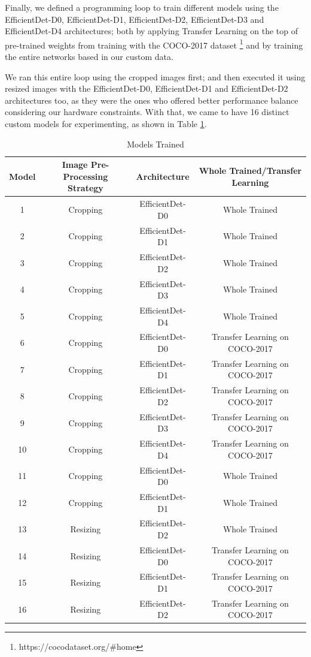 Finally, we defined a programming loop to train different models using the EfficientDet-D0,
EfficientDet-D1, EfficientDet-D2, EfficientDet-D3 and EfficientDet-D4 architectures; both by
applying Transfer Learning on the top of pre-trained weights from training with the COCO-2017 dataset 
\footnote{https://cocodataset.org/\#home} and by training the entire networks based in our custom data. 

We ran this entire loop using the cropped images first; and then executed it using resized images with the EfficientDet-D0,
EfficientDet-D1 and EfficientDet-D2 architectures too, as they were the ones who offered better
performance balance considering our hardware constraints. 
With that, we came to have 16 distinct custom models for experimenting, as shown in Table \ref{tbl:modelsTrainedTab}.

\begin{table}[H]
	\centering
	\caption[Models Trained]{Models Trained}
	\begin{adjustbox}{width=1\textwidth}
	\label{tab:modelsTrained}
	\begin{tabular}{c|c|c|c}
		\hline 
		Model & Image Pre-Processing Strategy & Architecture & Whole Trained/Transfer Learning \\
		\hline
        1 & Cropping & EfficientDet-D0 & Whole Trained \\
		2 & Cropping & EfficientDet-D1 & Whole Trained \\
		3 & Cropping & EfficientDet-D2 & Whole Trained \\
		4 & Cropping & EfficientDet-D3 & Whole Trained \\
		5 & Cropping & EfficientDet-D4 & Whole Trained \\
		6 & Cropping & EfficientDet-D0 & Transfer Learning on COCO-2017 \\
		7 & Cropping & EfficientDet-D1 & Transfer Learning on COCO-2017 \\
		8 & Cropping & EfficientDet-D2 & Transfer Learning on COCO-2017 \\
		9 & Cropping & EfficientDet-D3 & Transfer Learning on COCO-2017 \\
		10 & Cropping & EfficientDet-D4 & Transfer Learning on COCO-2017 \\
		11 & Cropping & EfficientDet-D0 & Whole Trained \\
		12 & Cropping & EfficientDet-D1 & Whole Trained \\
		13 & Resizing & EfficientDet-D2 & Whole Trained \\
		14 & Resizing & EfficientDet-D0 & Transfer Learning on COCO-2017 \\
		15 & Resizing & EfficientDet-D1 & Transfer Learning on COCO-2017 \\
		16 & Resizing & EfficientDet-D2 & Transfer Learning on COCO-2017 \\
		\hline 
	\end{tabular}
	\end{adjustbox}
	\label{tbl:modelsTrainedTab}
	\fonte{}
\end{table}

